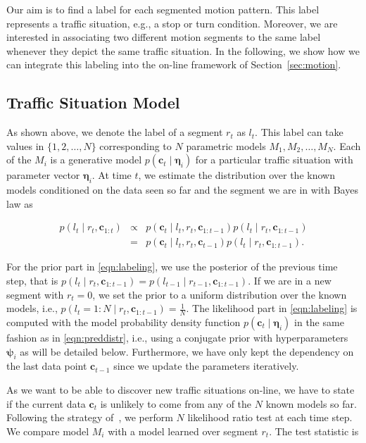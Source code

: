 Our aim is to find a label for each segmented motion pattern. This label
represents a traffic situation, e.g., a stop or turn condition. Moreover, we are
interested in associating two different motion segments to the same label
whenever they depict the same traffic situation. In the following, we show how
we can integrate this labeling into the on-line framework of
Section~\ref{sec:motion}.

\subsection{Traffic Situation Model}
As shown above, we denote the label of a segment $r_t$ as $l_t$. This label can
take values in $\{1,2,\dots,N\}$ corresponding to $N$ parametric models $M_1,
M_2,\dots,M_N$. Each of the $M_i$ is a generative model $p(\mathbf{c}_t\mid
\boldsymbol{\eta}_i)$ for a particular traffic situation with parameter vector
$\boldsymbol{\eta}_i$. At time $t$, we estimate the distribution over the known
models conditioned on the data seen so far and the segment we are in with Bayes
law as

\begin{eqnarray}
\label{eqn:labeling}
p(l_t\mid r_t,\mathbf{c}_{1:t})&\propto&p(\mathbf{c}_t\mid l_t,r_t,
\mathbf{c}_{1:t-1})p(l_t\mid r_t,\mathbf{c}_{1:t-1})\nonumber\\
&=& p(\mathbf{c}_t\mid l_t,r_t,\mathbf{c}_{t-1})p(l_t\mid
r_t,\mathbf{c}_{1:t-1}).
\end{eqnarray}

For the prior part in \eqref{eqn:labeling}, we use the posterior of the previous
time step, that is
$p(l_t\mid r_t,\mathbf{c}_{1:t-1})=p(l_{t-1}\mid r_{t-1},\mathbf{c}_{1:t-1})$.
If we are in a new segment with $r_t=0$, we set the prior to a uniform
distribution over the known models, i.e., $p(l_t=1:N\mid r_t,\mathbf{c}_{1:t-1})=
\frac{1}{N}$. The likelihood part in
\eqref{eqn:labeling} is computed with the model probability density function
$p(\mathbf{c}_t\mid \boldsymbol{\eta}_i)$ in the same fashion as in
\eqref{eqn:preddistr}, i.e., using a conjugate prior with hyperparameters
$\boldsymbol{\psi}_i$ as will be detailed below. Furthermore, we have only kept
the dependency on the last data point $\mathbf{c}_{t-1}$ since we update the
parameters iteratively.

As we want to be able to discover new traffic situations on-line, we have to
state if the current data $\mathbf{c}_t$ is unlikely to come from any of the
$N$ known models so far. Following the strategy of~\cite{ranganathan10pliss},
we perform $N$ likelihood ratio test at each time step. We compare model $M_i$
with a model learned over segment $r_t$. The test statistic is

